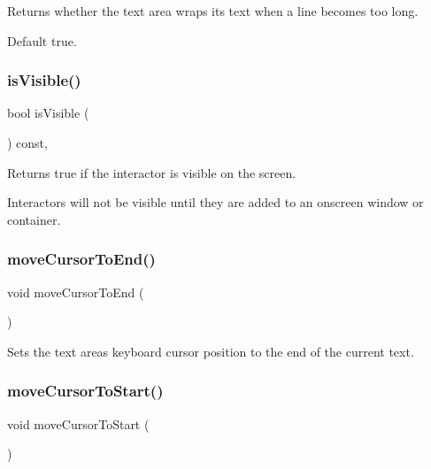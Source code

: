 Returns whether the text area wraps its text when a line becomes too long. 

Default true. \mbox{\label{classGInteractor_a9d8a6cfb13917785c143e74d40e4e2be}} 
\subsubsection{\texorpdfstring{is\+Visible()}{isVisible()}}
{\footnotesize\ttfamily bool is\+Visible (\begin{DoxyParamCaption}{ }\end{DoxyParamCaption}) const\hspace{0.3cm}{\ttfamily [virtual]}, {\ttfamily [inherited]}}



Returns true if the interactor is visible on the screen. 

Interactors will not be visible until they are added to an onscreen window or container. \mbox{\label{classGTextArea_ab5ef729cac166db0ef51ff7ea30d1bb8}} 
\subsubsection{\texorpdfstring{move\+Cursor\+To\+End()}{moveCursorToEnd()}}
{\footnotesize\ttfamily void move\+Cursor\+To\+End (\begin{DoxyParamCaption}{ }\end{DoxyParamCaption})\hspace{0.3cm}{\ttfamily [virtual]}}



Sets the text area\textquotesingle{}s keyboard cursor position to the end of the current text. 

\mbox{\label{classGTextArea_a24abdceab57bcff96185afbadf193a22}} 
\subsubsection{\texorpdfstring{move\+Cursor\+To\+Start()}{moveCursorToStart()}}
{\footnotesize\ttfamily void move\+Cursor\+To\+Start (\begin{DoxyParamCaption}{ }\end{DoxyParamCaption})\hspace{0.3cm}{\ttfamily [virtual]}}



